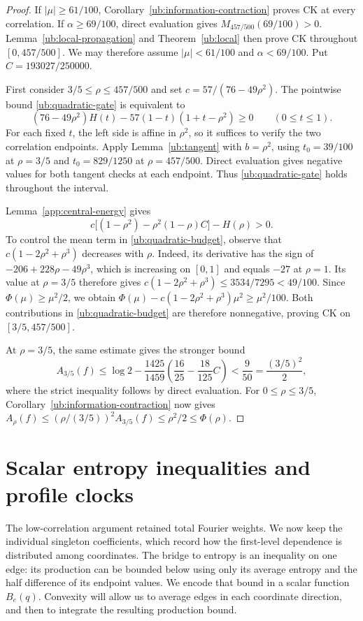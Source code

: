 \documentclass[11pt,letterpaper]{amsart}
\newcommand{\1}{\mathbf 1}
\numberwithin{equation}{section}
\begin{document}
\begin{proof}
If $|\mu|\ge61/100$, Corollary~\ref{ub:information-contraction}
proves CK at every correlation.
If $\alpha\ge69/100$, direct evaluation gives
$M_{457/500}(69/100)>0$.
Lemma~\ref{ub:local-propagation} and Theorem~\ref{ub:local}
then prove CK throughout $[0,457/500]$.
We may therefore assume
$|\mu|<61/100$ and $\alpha<69/100$.
Put $C=193027/250000$.

First consider $3/5\le\rho\le457/500$ and set
$c=57/(76-49\rho^2)$.
The pointwise bound \eqref{ub:quadratic-gate} is equivalent to
\[
 (76-49\rho^2)H(t)
 -57(1-t)(1+t-\rho^2)\ge0
 \qquad(0\le t\le1).
\]
For each fixed $t$, the left side is affine in $\rho^2$,
so it suffices to verify the two correlation endpoints.
Apply Lemma~\ref{ub:tangent} with $b=\rho^2$,
using $t_0=39/100$ at $\rho=3/5$ and
$t_0=829/1250$ at $\rho=457/500$.
Direct evaluation gives negative values for both tangent
checks at each endpoint.
Thus \eqref{ub:quadratic-gate} holds throughout the interval.

Lemma~\ref{app:central-energy} gives
\[
 c\bigl[(1-\rho^2)-\rho^2(1-\rho)C\bigr]-H(\rho)>0.
\]
To control the mean term in \eqref{ub:quadratic-budget},
observe that $c(1-2\rho^2+\rho^3)$ decreases with $\rho$.
Indeed, its derivative has the sign of
$-206+228\rho-49\rho^3$, which is increasing on $[0,1]$
and equals $-27$ at $\rho=1$.
Its value at $\rho=3/5$ therefore gives
$c(1-2\rho^2+\rho^3)\le3534/7295<49/100$.
Since $\Phi(\mu)\ge\mu^2/2$, we obtain
$\Phi(\mu)-c(1-2\rho^2+\rho^3)\mu^2\ge\mu^2/100$.
Both contributions in \eqref{ub:quadratic-budget}
are therefore nonnegative, proving CK on $[3/5,457/500]$.

At $\rho=3/5$, the same estimate gives the stronger bound
\[
 A_{3/5}(f)
 \le\log2-\frac{1425}{1459}
       \left(\frac{16}{25}-\frac{18}{125}C\right)
 <\frac9{50}
 =\frac{(3/5)^2}{2},
\]
where the strict inequality follows by direct evaluation.
For $0\le\rho\le3/5$,
Corollary~\ref{ub:information-contraction} now gives
$A_\rho(f)\le(\rho/(3/5))^2A_{3/5}(f)
\le\rho^2/2\le\Phi(\rho)$.
\end{proof}

\section{Scalar entropy inequalities and profile clocks}\label{sec:profile-clocks}

The low-correlation argument retained total Fourier weights. We now
keep the individual singleton coefficients, which record how the
first-level dependence is distributed among coordinates. The bridge
to entropy is an inequality on one edge: its production can be bounded
below using only its average entropy and the half difference of its
endpoint values. We encode that bound in a scalar function $B_e(q)$.
Convexity will allow us to average edges in each coordinate direction,
and then to integrate the resulting production bound.
\end{document}
